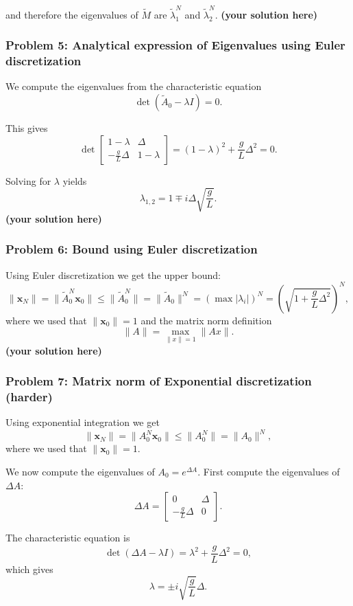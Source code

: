 \documentclass[12pt,twoside]{article}
\newcommand\redt[1]{ {\textcolor[rgb]{0.60, 0.00, 0.00}{\textbf{ #1} } } }
\newcommand{\yoursolution}{ \redt{(your solution here) } }
\begin{document}
and therefore the eigenvalues of $\tilde{M}$ are $\tilde{\lambda}_1^N$ and $\tilde{\lambda}_2^N$.
\yoursolution
	
\subsubsection*{{\color{red}Problem 5:  Analytical expression of Eigenvalues using Euler discretization}}

We compute the eigenvalues from the characteristic equation
\[
\det(\tilde{A}_0 - \lambda I) = 0.
\]

This gives
\[
\det
\begin{bmatrix}
1 - \lambda & \Delta \\
-\frac{g}{L}\Delta & 1 - \lambda
\end{bmatrix}
= (1 - \lambda)^2 + \frac{g}{L}\Delta^2 = 0.
\]

Solving for $\lambda$ yields
\[
\lambda_{1,2} = 1 \mp i \Delta \sqrt{\frac{g}{L}}.
\]
\yoursolution

\subsubsection*{{\color{red}Problem 6:  Bound using Euler discretization}}

Using Euler discretization we get the upper bound:
$$
\| \mathbf{x}_N \| = \| \tilde{A}_0^N \mathbf{x}_0 \| 
\leq \| \tilde{A}_0^N \|
= \| \tilde{A}_0 \|^N 
= \left( \max |\lambda_i| \right)^N 
= \left(\sqrt{1 + \frac{g}{L}\Delta^2}\right)^N,
$$
where we used that $\|\mathbf{x}_0\| = 1$ and the matrix norm definition
$$
\|A\| = \max_{\|x\|=1} \|Ax\|.
$$
\yoursolution
	
\subsubsection*{{\color{red}Problem 7:  Matrix norm of Exponential discretization (harder)}}
	
Using exponential integration we get
$$
\| \mathbf{x}_N \| = \| A_0^N \mathbf{x}_0 \| 
\leq \| A_0^N \|
= \| A_0 \|^N,
$$
where we used that $\|\mathbf{x}_0\| = 1$.

We now compute the eigenvalues of $A_0 = e^{\Delta A}$. First compute the eigenvalues of $\Delta A$:
\[
\Delta A =
\begin{bmatrix}
0 & \Delta \\
-\frac{g}{L}\Delta & 0
\end{bmatrix}.
\]

The characteristic equation is
\[
\det(\Delta A - \lambda I) = \lambda^2 + \frac{g}{L}\Delta^2 = 0,
\]
which gives
\[
\lambda = \pm i \sqrt{\frac{g}{L}} \Delta.
\]
\end{document}
